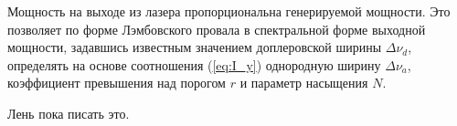 \documentclass[12pt, russian, a4paper]{article}
\begin{document}
	Мощность на выходе из лазера пропорциональна генерируемой мощности. Это позволяет по форме Лэмбовского провала в спектральной форме выходной мощности, задавшись известным значением доплеровской ширины $\Delta\nu_d$, определять на основе соотношения (\ref{eq:I_y}) однородную ширину $\Delta\nu_a$, коэффициент превышения над порогом $r$ и параметр насыщения $N$.


	Лень пока писать это.
\end{document}
